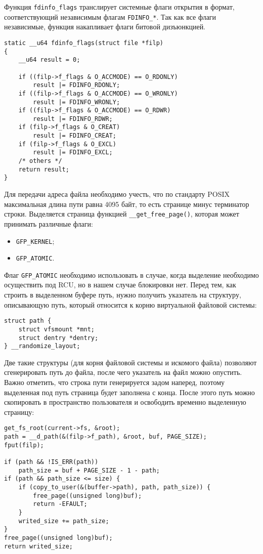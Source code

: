 Функция \texttt{fdinfo\_flags} транслирует системные флаги открытия в формат,
соответствующий независимым флагам \texttt{FDINFO\_*}. Так как все флаги
независимые, функция накапливает флаги битовой дизъюнкцией.
\medskip
\begin{lstlisting}[style=cstyle]
static __u64 fdinfo_flags(struct file *filp)
{
	__u64 result = 0;

	if ((filp->f_flags & O_ACCMODE) == O_RDONLY)
		result |= FDINFO_RDONLY;
	if ((filp->f_flags & O_ACCMODE) == O_WRONLY)
		result |= FDINFO_WRONLY;
	if ((filp->f_flags & O_ACCMODE) == O_RDWR)
		result |= FDINFO_RDWR;
	if (filp->f_flags & O_CREAT)
		result |= FDINFO_CREAT;
	if (filp->f_flags & O_EXCL)
		result |= FDINFO_EXCL;
	/* others */
	return result;
}
\end{lstlisting}
\medskip

Для передачи адреса файла необходимо учесть, что по стандарту POSIX максимальная
длина пути равна 4095 байт, то есть странице минус терминатор строки. Выделяется
страница функцией \texttt{\_\_get\_free\_page()}, которая может принимать
различные флаги:
\begin{itemize}
\item \texttt{GFP\_KERNEL};
\item \texttt{GFP\_ATOMIC}.
\end{itemize}

Флаг \texttt{GFP\_ATOMIC} необходимо использовать в случае, когда выделение
необходимо осуществить под RCU, но в нашем случае блокировки нет. Перед тем, как
строить в выделенном буфере путь, нужно получить указатель на структуру,
описывающую путь, который относится к корню виртуальной файловой системы:
\medskip
\begin{lstlisting}[style=cstyle]
struct path {
	struct vfsmount *mnt;
	struct dentry *dentry;
} __randomize_layout;
\end{lstlisting}
\medskip

Две такие структуры (для корня файловой системы и искомого файла) позволяют
сгенерировать путь до файла, после чего указатель на файл можно опустить. Важно
отметить, что строка пути генерируется задом наперед, поэтому выделенная под
путь страница будет заполнена с конца. После этого путь можно скопировать в
пространство пользователя и освободить временно выделенную страницу:
\medskip
\begin{lstlisting}[style=cstyle]
get_fs_root(current->fs, &root);
path = __d_path(&(filp->f_path), &root, buf, PAGE_SIZE);
fput(filp);

if (path && !IS_ERR(path))
	path_size = buf + PAGE_SIZE - 1 - path;
if (path && path_size <= size) {
	if (copy_to_user(&(buffer->path), path, path_size)) {
		free_page((unsigned long)buf);
		return -EFAULT;
	}
	writed_size += path_size;
}
free_page((unsigned long)buf);
return writed_size;
\end{lstlisting}
\medskip

